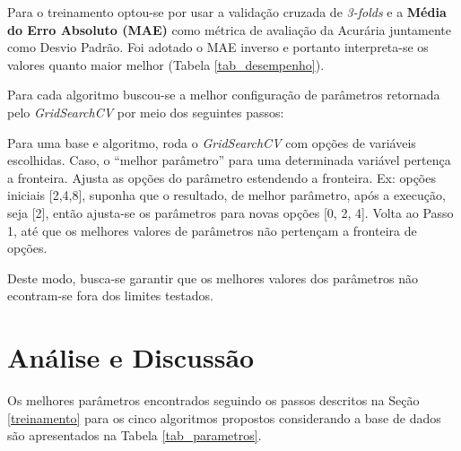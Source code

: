 \documentclass[12pt]{article}
\begin{document}
Para o treinamento optou-se por usar a validação cruzada de \textit{3-folds} e a  \textbf{Média do Erro Absoluto (MAE)} como métrica de avaliação da Acurária juntamente como Desvio Padrão. Foi adotado o MAE inverso e portanto interpreta-se os valores quanto maior melhor (Tabela \ref{tab_desempenho}).

Para cada algoritmo buscou-se a melhor configuração de parâmetros retornada pelo \textit{GridSearchCV} por meio dos seguintes passos:

\begin{outline}[enumerate]
  \1 Para uma base e algoritmo, roda o \textit{GridSearchCV} com opções de variáveis escolhidas.
  \1 Caso, o ``melhor parâmetro'' para uma determinada variável pertença a fronteira.
  \2 Ajusta as opções do parâmetro estendendo a fronteira. Ex: opções iniciais [2,4,8], suponha que o resultado, de melhor parâmetro, após a execução, seja [2], então ajusta-se os parâmetros para novas opções [0, 2, 4].
  \1 Volta ao Passo 1, até que os melhores valores de parâmetros não pertençam a fronteira de opções.
\end{outline}

Deste modo, busca-se garantir que os melhores valores dos parâmetros não econtram-se fora dos limites testados.

\section{Análise e Discussão}

Os melhores parâmetros encontrados seguindo os passos descritos na Seção \ref{treinamento} para os cinco algoritmos propostos considerando a base de dados são apresentados na Tabela \ref{tab_parametros}.
\end{document}

